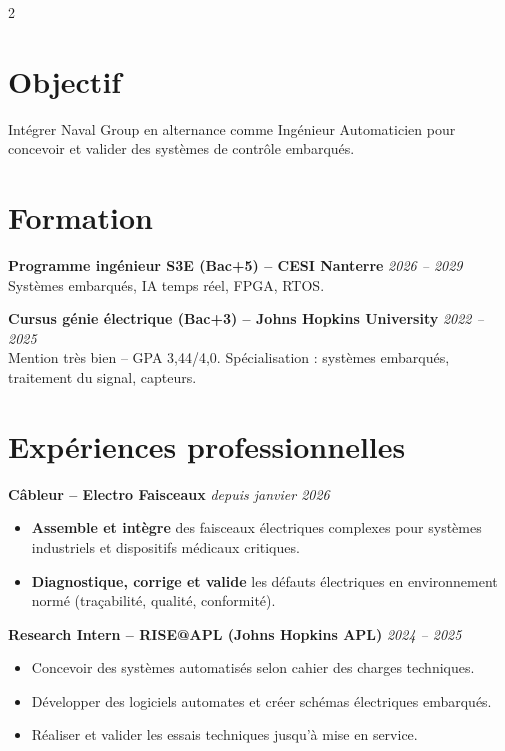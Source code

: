 \documentclass[10pt,a4paper]{article}
\begin{document}
\begin{multicols}{2}

\section*{Objectif}
Intégrer Naval Group en alternance comme Ingénieur Automaticien pour concevoir et valider des systèmes de contrôle embarqués.

\section*{Formation}
\textbf{Programme ingénieur S3E (Bac+5) – CESI Nanterre} \hfill \textit{2026 – 2029} \\
Systèmes embarqués, IA temps réel, FPGA, RTOS.

\textbf{Cursus génie électrique (Bac+3) – Johns Hopkins University} \hfill \textit{2022 – 2025} \\
Mention très bien – GPA 3,44/4,0. Spécialisation : systèmes embarqués, traitement du signal, capteurs.


\section*{Expériences professionnelles}
\textbf{Câbleur – Electro Faisceaux} \hfill \textit{depuis janvier 2026}
\begin{itemize}[leftmargin=*]
    \item \textbf{Assemble et intègre} des faisceaux électriques complexes pour systèmes industriels et dispositifs médicaux critiques.
    \item \textbf{Diagnostique, corrige et valide} les défauts électriques en environnement normé (traçabilité, qualité, conformité).
\end{itemize}

\textbf{Research Intern – RISE@APL (Johns Hopkins APL)} \hfill \textit{2024 – 2025}
\begin{itemize}[leftmargin=*]
    \item Concevoir des systèmes automatisés selon cahier des charges techniques.
    \item Développer des logiciels automates et créer schémas électriques embarqués.
    \item Réaliser et valider les essais techniques jusqu'à mise en service.
\end{itemize}


\end{multicols}
\end{document}
